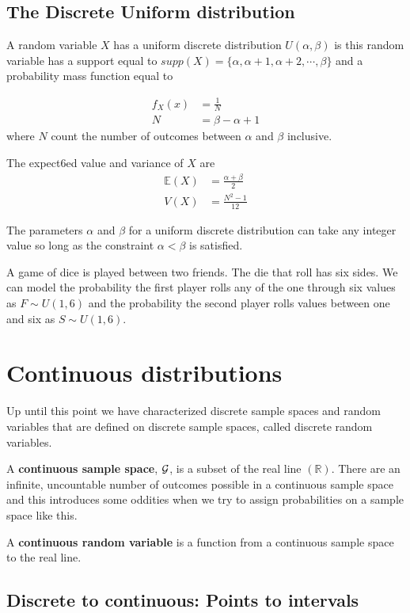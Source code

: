 \subsection{The Discrete Uniform distribution }

A random variable $X$ has a uniform discrete distribution $U(\alpha, \beta)$ is this random variable has a support equal to $supp(X) = \{\alpha, \alpha+1,\alpha+2,\cdots,\beta\}$ and a probability mass function equal to 

\begin{align}
    f_{X}(x) &= \frac{1}{ N  } \\ 
           N &= \beta - \alpha + 1
\end{align}
where $N$ count the number of outcomes between $\alpha$ and $\beta$ inclusive. 

The expect6ed value and variance of $X$ are
\begin{align}
    \mathbb{E}(X) &= \frac{\alpha + \beta}{2} \\ 
             V(X) &= \frac{N^2-1}{12}
\end{align}

The parameters $\alpha$ and $\beta$ for a uniform discrete distribution can take any integer value so long as the constraint $\alpha < \beta$ is satisfied. 

\ex A game of dice is played between two friends. The die that roll has six sides. We can model the probability the first player rolls any of the one through six values as $F \sim U(1,6)$ and the probability the second player rolls values between one and six as $S \sim U(1,6)$. 

\section{Continuous distributions}

Up until this point we have characterized discrete sample spaces and random variables that are defined on discrete sample spaces, called discrete random variables. 

A \textbf{continuous sample space}, $\mathcal{G}$, is a subset of the real line $(\mathbb{R})$. There are an infinite, uncountable number of outcomes possible in a continuous sample space and this introduces some oddities when we try to assign probabilities on a sample space like this.

A \textbf{continuous random variable} is a function from a continuous sample space to the real line.

\subsection{Discrete to continuous: Points to intervals}

